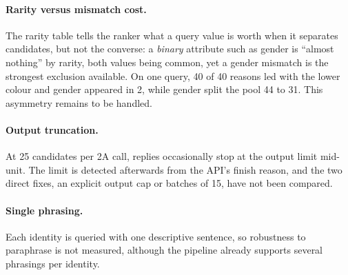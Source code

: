 \paragraph{Rarity versus mismatch cost.} The rarity table tells the ranker what a
query value is worth when it separates candidates, but not the converse: a
\emph{binary} attribute such as gender is ``almost nothing'' by rarity, both values
being common, yet a gender mismatch is the strongest exclusion available. On one
query, 40 of 40 reasons led with the lower colour and gender appeared in 2, while
gender split the pool 44 to 31. This asymmetry remains to be handled.

\paragraph{Output truncation.} At 25 candidates per 2A call, replies occasionally
stop at the output limit mid-unit. The limit is detected afterwards from the API's
finish reason, and the two direct fixes, an explicit output cap or batches of 15,
have not been compared.

\paragraph{Single phrasing.} Each identity is queried with one descriptive
sentence, so robustness to paraphrase is not measured, although the pipeline
already supports several phrasings per identity.
